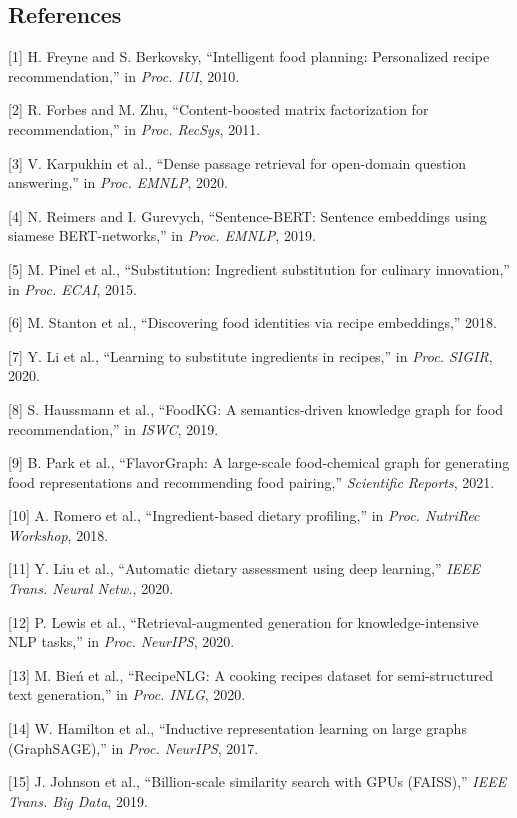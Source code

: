 \documentclass[10pt,conference,compsoc]{IEEEtran}
\begin{document}
\subsection{References}\label{references}

{[}1{]} H. Freyne and S. Berkovsky, ``Intelligent food planning:
Personalized recipe recommendation,'' in \emph{Proc. IUI}, 2010.

{[}2{]} R. Forbes and M. Zhu, ``Content-boosted matrix factorization for
recommendation,'' in \emph{Proc. RecSys}, 2011.

{[}3{]} V. Karpukhin et al., ``Dense passage retrieval for open-domain
question answering,'' in \emph{Proc. EMNLP}, 2020.

{[}4{]} N. Reimers and I. Gurevych, ``Sentence-BERT: Sentence embeddings
using siamese BERT-networks,'' in \emph{Proc. EMNLP}, 2019.

{[}5{]} M. Pinel et al., ``Substitution: Ingredient substitution for
culinary innovation,'' in \emph{Proc. ECAI}, 2015.

{[}6{]} M. Stanton et al., ``Discovering food identities via recipe
embeddings,'' 2018.

{[}7{]} Y. Li et al., ``Learning to substitute ingredients in recipes,''
in \emph{Proc. SIGIR}, 2020.

{[}8{]} S. Haussmann et al., ``FoodKG: A semantics-driven knowledge
graph for food recommendation,'' in \emph{ISWC}, 2019.

{[}9{]} B. Park et al., ``FlavorGraph: A large-scale food-chemical graph
for generating food representations and recommending food pairing,''
\emph{Scientific Reports}, 2021.

{[}10{]} A. Romero et al., ``Ingredient-based dietary profiling,'' in
\emph{Proc. NutriRec Workshop}, 2018.

{[}11{]} Y. Liu et al., ``Automatic dietary assessment using deep
learning,'' \emph{IEEE Trans. Neural Netw.}, 2020.

{[}12{]} P. Lewis et al., ``Retrieval-augmented generation for
knowledge-intensive NLP tasks,'' in \emph{Proc. NeurIPS}, 2020.

{[}13{]} M. Bień et al., ``RecipeNLG: A cooking recipes dataset for
semi-structured text generation,'' in \emph{Proc. INLG}, 2020.

{[}14{]} W. Hamilton et al., ``Inductive representation learning on
large graphs (GraphSAGE),'' in \emph{Proc. NeurIPS}, 2017.

{[}15{]} J. Johnson et al., ``Billion-scale similarity search with GPUs
(FAISS),'' \emph{IEEE Trans. Big Data}, 2019.
\end{document}
